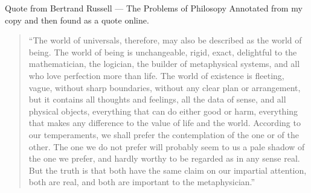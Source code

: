 \begin{noteforfuture}
\end{noteforfuture}

Quote from Bertrand Russell --- The Problems of Philosopy Annotated from my copy and then found as a quote online.
\begin{quote}
“The world of universals, therefore, may also be described as the world of being. The world of being is unchangeable, rigid, exact, delightful to the mathematician, the logician, the builder of metaphysical systems, and all who love perfection more than life. The world of existence is fleeting, vague, without sharp boundaries, without any clear plan or arrangement, but it contains all thoughts and feelings, all the data of sense, and all physical objects, everything that can do either good or harm, everything that makes any difference to the value of life and the world. According to our temperaments, we shall prefer the contemplation of the one or of the other. The one we do not prefer will probably seem to us a pale shadow of the one we prefer, and hardly worthy to be regarded as in any sense real. But the truth is that both have the same claim on our impartial attention, both are real, and both are important to the metaphysician.”
\end{quote}
